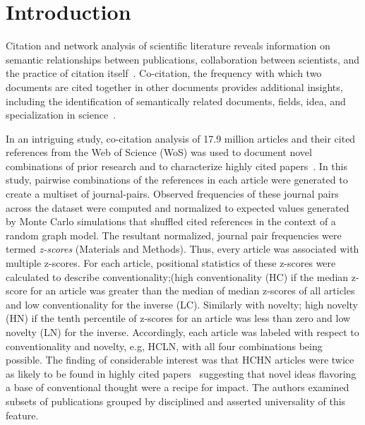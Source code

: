 \documentclass[NETN]{stjour}
\begin{document}


\section{Introduction}
Citation and network analysis of  scientific literature reveals information on semantic relationships between publications, collaboration between scientists, and the practice of citation itself~\citep{garfield_citation_1955,de_solla_price_networks_1965,newman_structure_2001,Shi:2010:CHI:1816123.1816131,patience_pmid28560354}. Co-citation, the frequency with which two documents are cited together in other documents provides additional insights, including the identification of semantically related documents, fields, idea, and specialization in science~\citep{small_co-citation_1973,marshakova-shaikevich_co-citation_1973}. 

In an intriguing study, co-citation analysis of 17.9 million articles and their cited references from the Web of Science (WoS) was used to document novel combinations of prior research and to characterize highly cited papers~\citep{uzzi_atypical_2013}. In this study, pairwise combinations of the references in each article were generated to create a multiset of journal-pairs. Observed frequencies of these journal pairs across the dataset were computed and normalized to expected values generated by Monte Carlo simulations that shuffled cited references in the context of a random graph model. The resultant normalized, journal pair frequencies were termed \emph{z-scores} (Materials and Methods). Thus, every article was associated with multiple z-scores. For each article, positional statistics of these z-scores were calculated to describe conventionality;(high conventionality (HC) if the median z-score for an article was greater than the median of median z-scores of all articles and low conventionality for the inverse (LC). Similarly with novelty;  high novelty (HN) if the tenth percentile of z-scores for an article was less than zero and low novelty (LN) for the inverse. Accordingly, each article was labeled with respect to conventionality and novelty, e.g, HCLN, with all four combinations being possible. The finding of considerable interest was that HCHN articles were twice as likely to be found in highly cited papers~\citep{uzzi_atypical_2013} suggesting that novel ideas flavoring a base of conventional thought were a recipe for impact. The authors examined subsets of publications grouped by disciplined and asserted universality of this feature.
\end{document}
